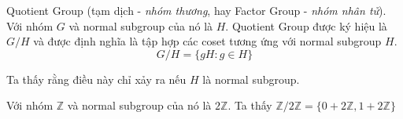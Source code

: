 \begin{definition}{Quotient Group}
    (tạm dịch - \textit{nhóm thương}, hay Factor Group - \textit{nhóm nhân tử}). Với nhóm $G$ và normal subgroup của nó là $H$.
    Quotient Group được ký hiệu là $G / H$ và được định nghĩa là tập hợp các coset tương ứng với normal subgroup $H$.
    \[G / H = \{gH : g \in H \}\]

    Ta thấy rằng điều này chỉ xảy ra nếu $H$ là normal subgroup.
\end{definition}

\begin{example}
    Với nhóm $\mathbb{Z}$ và normal subgroup của nó là $2\mathbb{Z}$.
    Ta thấy $\mathbb{Z} / 2 \mathbb{Z} = \{0 + 2 \mathbb{Z}, 1 + 2 \mathbb{Z}\}$
\end{example}
\newpage